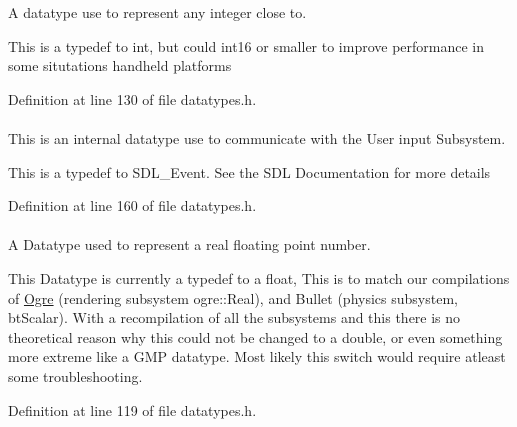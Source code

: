 A datatype use to represent any integer close to. 

This is a typedef to int, but could int16 or smaller to improve performance in some situtations handheld platforms 

Definition at line 130 of file datatypes.h.

\hypertarget{namespaceMezzanine_ae8d4c0ab783af89a250b0225b75753e5}{
\paragraph[{RawEvent}]{}\hfill}
\label{namespaceMezzanine_ae8d4c0ab783af89a250b0225b75753e5}


This is an internal datatype use to communicate with the User input Subsystem. 

This is a typedef to SDL\_\-Event. See the SDL Documentation for more details 

Definition at line 160 of file datatypes.h.

\hypertarget{namespaceMezzanine_a726731b1a7df72bf3583e4a97282c6f6}{
\paragraph[{Real}]{}\hfill}
\label{namespaceMezzanine_a726731b1a7df72bf3583e4a97282c6f6}


A Datatype used to represent a real floating point number. 

This Datatype is currently a typedef to a float, This is to match our compilations of \hyperlink{namespaceOgre}{Ogre} (rendering subsystem ogre::Real), and Bullet (physics subsystem, btScalar). With a recompilation of all the subsystems and this there is no theoretical reason why this could not be changed to a double, or even something more extreme like a GMP datatype. Most likely this switch would require atleast some troubleshooting. 

Definition at line 119 of file datatypes.h.

\hypertarget{namespaceMezzanine_acf9fcc130e6ebf08e3d8491aebcf1c86}{
\paragraph[{String}]{}\hfill}
\label{namespaceMezzanine_acf9fcc130e6ebf08e3d8491aebcf1c86}


